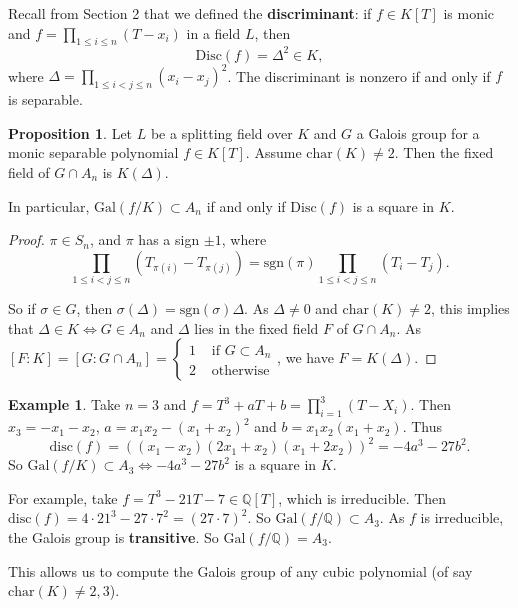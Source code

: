\documentclass{article}
\theoremstyle{definition}
\newtheorem{prop}[theorem]{Proposition}
\newtheorem{example}{Example}[section]
\begin{document}
Recall from Section 2 that we defined the \textbf{discriminant}: if $f \in K[T]$ is monic and $f = \prod_{1\le i \le n}^{} (T-x_i)$ in a field $L$, then
\[
\text{Disc}(f) = \Delta^2 \in K,
\]
where $\Delta = \prod_{1\le i < j \le n}^{} (x_i-x_j)^2$. The discriminant is nonzero if and only if $f$ is separable.
\begin{prop}
    Let $L$ be a splitting field over $K$ and $G$ a Galois group for a monic separable polynomial $f \in K[T]$. Assume $\text{char}(K)\neq 2$. Then the fixed field of $G \cap A_n$ is $K(\Delta)$.
    \vspace{1mm}

    In particular, $\text{Gal}(f/K) \subset A_n$ if and only if $\text{Disc}(f)$ is a square in $K$.
\end{prop}

\begin{proof}

    $\pi \in S_n$, and $\pi$ has a sign $\pm 1$, where $$\prod_{1\le i<j\le n}^{} (T_{\pi(i)}-T_{\pi(j)})=\text{sgn}(\pi)\prod_{1\le i<j\le n}^{} (T_i-T_j).$$

    So if $\sigma \in G$, then $\sigma(\Delta) = \text{sgn}(\sigma)\Delta$. As $\Delta \neq 0$ and $\text{char}(K)\neq 2$, this implies that $\Delta \in K \iff G \in A_n$ and $\Delta$ lies in the fixed field $F$ of $G \cap A_n$. As $[F: K] = [G : G \cap A_n] = \begin{cases}
        1 &\text{ if } G \subset A_n \\
        2 &\text{ otherwise}
    \end{cases}$, we have $F = K(\Delta)$.
\end{proof}
\begin{example}
    Take $n=3$ and $f = T^3+aT+b = \prod_{i=1}^{3} (T-X_i)$. Then $x_3 = -x_1-x_2$, $a = x_1x_2 - (x_1+x_2)^2$ and $b=x_1x_2(x_1+x_2)$. Thus \[
    \text{disc}(f) = ((x_1-x_2)(2x_1+x_2)(x_1+2x_2))^2 = -4a^3 - 27b^2.
    \]
    So $\text{Gal}(f/K) \subset A_3 \iff -4a^3-27b^2$ is a square in $K$.
    \vspace{1mm}

    For example, take $f = T^3-21T - 7 \in \mathbb{Q}[T]$, which is irreducible. Then $\text{disc}(f)=4 \cdot 21^3 - 27 \cdot  7 ^2 = (27\cdot 7)^2$. So $\text{Gal}(f/\mathbb{Q}) \subset A_3$. As $f$ is irreducible, the Galois group is \textbf{transitive}. So $\text{Gal}(f/\mathbb{Q}) = A_3$.
\end{example}
This allows us to compute the Galois group of any cubic polynomial (of say $\text{char}(K)\neq2,3$).
\end{document}
